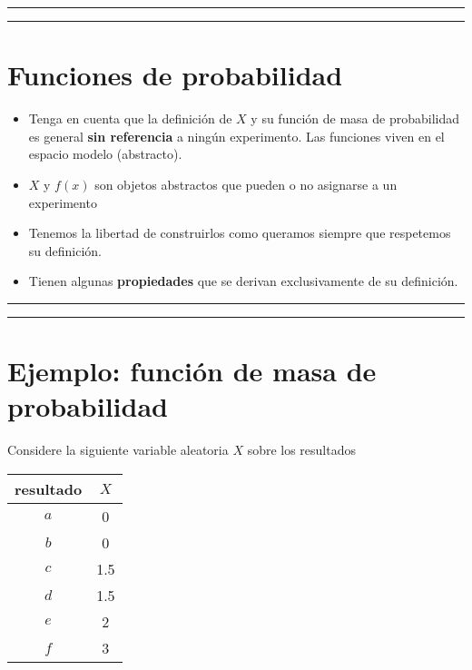 \documentclass[
]{book}
\begin{document}
\begin{center}\rule{0.5\linewidth}{0.5pt}\end{center}

\begin{center}\rule{0.5\linewidth}{0.5pt}\end{center}

\hypertarget{funciones-de-probabilidad-3}{%
\section{Funciones de probabilidad}\label{funciones-de-probabilidad-3}}

\begin{itemize}
\item
  Tenga en cuenta que la definición de \(X\) y su función de masa de probabilidad es general \textbf{sin referencia} a ningún experimento. Las funciones viven en el espacio modelo (abstracto).
\item
  \(X\) y \(f(x)\) son objetos abstractos que pueden o no asignarse a un experimento
\item
  Tenemos la libertad de construirlos como queramos siempre que respetemos su definición.
\item
  Tienen algunas \textbf{propiedades} que se derivan exclusivamente de su definición.
\end{itemize}

\begin{center}\rule{0.5\linewidth}{0.5pt}\end{center}

\begin{center}\rule{0.5\linewidth}{0.5pt}\end{center}

\hypertarget{ejemplo-funciuxf3n-de-masa-de-probabilidad}{%
\section{Ejemplo: función de masa de probabilidad}\label{ejemplo-funciuxf3n-de-masa-de-probabilidad}}

Considere la siguiente variable aleatoria \(X\) sobre los resultados

\begin{longtable}[]{@{}cc@{}}
\toprule
resultado & \(X\) \\
\midrule
\endhead
\(a\) & 0 \\
\(b\) & 0 \\
\(c\) & 1.5 \\
\(d\) & 1.5 \\
\(e\) & 2 \\
\(f\) & 3 \\
\bottomrule
\end{longtable}
\end{document}
